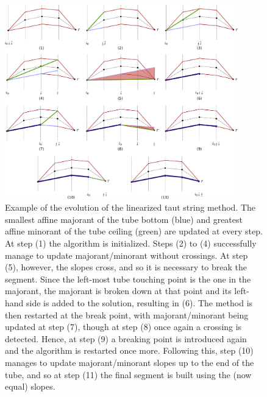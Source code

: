 \documentclass[twoside,11pt]{article}
\numberwithin{equation}{section}
\numberwithin{theorem}{section}
\begin{document}
\begin{figure}[t]
  \centering
  \includegraphics[width = 0.9\textwidth]{tautStringAlgEvolution}
  \caption{\small Example of the evolution of the linearized taut string method. The smallest affine majorant of the tube bottom (blue) and greatest affine minorant of the tube ceiling (green) are updated at every step. At step (1) the algorithm is initialized. Steps (2) to (4) successfully manage to update majorant/minorant without crossings. At step (5), however, the slopes cross, and so it is necessary to break the segment. Since the left-most tube touching point is the one in the majorant, the majorant is broken down at that point and its left-hand side is added to the solution, resulting in (6). The method is then restarted at the break point, with majorant/minorant being updated at step (7), though at step (8) once again a crossing is detected. Hence, at step (9) a breaking point is introduced again and the algorithm is restarted once more. Following this, step (10) manages to update majorant/minorant slopes up to the end of the tube, and so at step (11) the final segment is built using the (now equal) slopes.
   }   \label{fig:tautStringAlgEvolution}
\end{figure}
\end{document}
